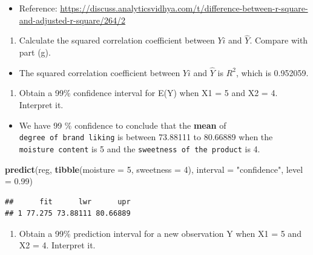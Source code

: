 \documentclass[
]{article}
\newenvironment{Shaded}{\begin{snugshade}}{\end{snugshade}}
\newcommand{\DataTypeTok}[1]{\textcolor[rgb]{0.13,0.29,0.53}{#1}}
\newcommand{\DecValTok}[1]{\textcolor[rgb]{0.00,0.00,0.81}{#1}}
\newcommand{\FloatTok}[1]{\textcolor[rgb]{0.00,0.00,0.81}{#1}}
\newcommand{\KeywordTok}[1]{\textcolor[rgb]{0.13,0.29,0.53}{\textbf{#1}}}
\newcommand{\NormalTok}[1]{#1}
\newcommand{\StringTok}[1]{\textcolor[rgb]{0.31,0.60,0.02}{#1}}
\providecommand{\tightlist}{%
  \setlength{\itemsep}{0pt}\setlength{\parskip}{0pt}}
\begin{document}
\begin{itemize}
\tightlist
\item
  Reference:
  \url{https://discuss.analyticsvidhya.com/t/difference-between-r-square-and-adjusted-r-square/264/2}
\end{itemize}

\begin{enumerate}
\def\labelenumi{(\alph{enumi})}
\setcounter{enumi}{7}
\tightlist
\item
  Calculate the squared correlation coefficient between \(Yi\) and
  \(\hat{Y}\). Compare with part (g).
\end{enumerate}

\begin{itemize}
\tightlist
\item
  The squared correlation coefficient between \(Yi\) and \(\hat{Y}\) is
  \(R^2\), which is 0.952059.
\end{itemize}

\begin{enumerate}
\def\labelenumi{(\roman{enumi})}
\tightlist
\item
  Obtain a 99\% confidence interval for E(Y) when X1 = 5 and X2 = 4.
  Interpret it.
\end{enumerate}

\begin{itemize}
\tightlist
\item
  We have 99 \% confidence to conclude that the \textbf{mean} of
  \texttt{degree\ of\ brand\ liking} is between 73.88111 to 80.66889
  when the \texttt{moisture\ content} is 5 and the
  \texttt{sweetness\ of\ the\ product} is 4.
\end{itemize}

\begin{Shaded}
\begin{Highlighting}[]
\KeywordTok{predict}\NormalTok{(reg, }\KeywordTok{tibble}\NormalTok{(}\DataTypeTok{moisture =} \DecValTok{5}\NormalTok{, }\DataTypeTok{sweetness =} \DecValTok{4}\NormalTok{), }\DataTypeTok{interval =} \StringTok{"confidence"}\NormalTok{, }\DataTypeTok{level =} \FloatTok{0.99}\NormalTok{)}
\end{Highlighting}
\end{Shaded}

\begin{verbatim}
##      fit      lwr      upr
## 1 77.275 73.88111 80.66889
\end{verbatim}

\begin{enumerate}
\def\labelenumi{(\alph{enumi})}
\setcounter{enumi}{9}
\tightlist
\item
  Obtain a 99\% prediction interval for a new observation Y when X1 = 5
  and X2 = 4. Interpret it.
\end{enumerate}
\end{document}

